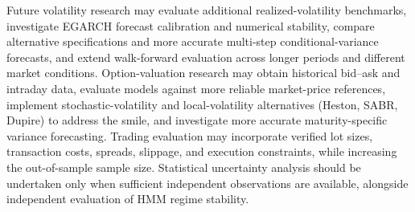 \documentclass[journal]{IEEEtran}
\begin{document}
Future volatility research may evaluate additional realized-volatility benchmarks, investigate EGARCH forecast calibration and numerical stability, compare alternative specifications and more accurate multi-step conditional-variance forecasts, and extend walk-forward evaluation across longer periods and different market conditions. Option-valuation research may obtain historical bid--ask and intraday data, evaluate models against more reliable market-price references, implement stochastic-volatility and local-volatility alternatives (Heston, SABR, Dupire) to address the smile, and investigate more accurate maturity-specific variance forecasting. Trading evaluation may incorporate verified lot sizes, transaction costs, spreads, slippage, and execution constraints, while increasing the out-of-sample sample size. Statistical uncertainty analysis should be undertaken only when sufficient independent observations are available, alongside independent evaluation of HMM regime stability.
\end{document}
